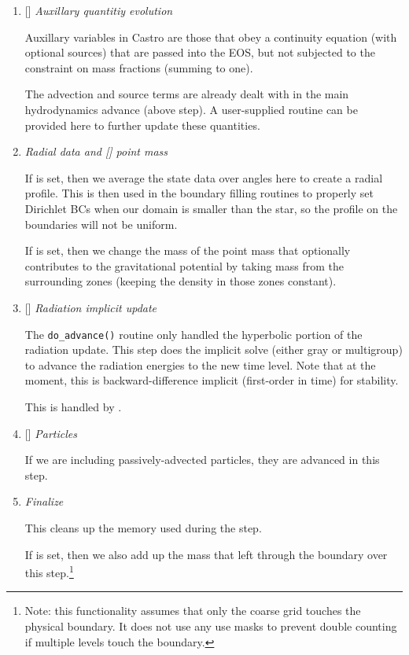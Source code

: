 \begin{enumerate}
\item {[]} {\em Auxillary quantitiy evolution} 

  Auxillary variables in Castro are those that obey a continuity
  equation (with optional sources) that are passed into the EOS, but
  not subjected to the constraint on mass fractions (summing to one).

  The advection and source terms are already dealt with in the 
  main hydrodynamics advance (above step).  A user-supplied routine
   can be provided here to further update these
  quantities.
  
\item {\em Radial data and {\rm[]} point mass} 

  If  is set, then we average the state data
  over angles here to create a radial profile.  This is then used in the 
  boundary filling routines to properly set Dirichlet BCs when our domain
  is smaller than the star, so the profile on the boundaries will not 
  be uniform.

  If  is set, then we
  change the mass of the point mass that optionally contributes to the
  gravitational potential by taking mass from the surrounding zones
  (keeping the density in those zones constant).

\item {[]} {\em Radiation implicit update} 

  The {\tt do\_advance()} routine only handled the hyperbolic
  portion of the radiation update.  This step does the implicit solve
  (either gray or multigroup) to advance the radiation energies to the 
  new time level.  Note that at the moment, this is backward-difference
  implicit (first-order in time) for stability.

  This is handled by .

\item {[]} {\em Particles} 

  If we are including passively-advected particles, they are
  advanced in this step.

\item {\em Finalize}

  This cleans up the memory used during the step.  

  If  is set, then we also add up
  the mass that left through the boundary over this
  step.\footnote{Note: this functionality assumes that only the
    coarse grid touches the physical boundary.  It does not use any
    use masks to prevent double counting if multiple levels touch
    the boundary.}

\end{enumerate}


